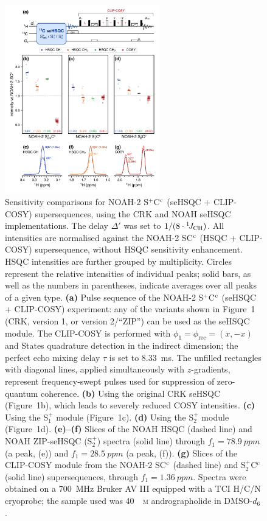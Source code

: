 \documentclass[final,twocolumn]{elsarticle}
\newcommand*{\noahCc}{C$\rm ^c$}
\newcommand*{\noahS}{S}
\newcommand*{\noahSp}{S$^+$}
\newcommand*{\noahSpa}{S$^+_1$}
\newcommand*{\noahSpb}{S$^+_2$}
\newcommand*{\onejch}{{}^{1}\!J_{\ce{CH}}}
\begin{document}
\begin{figure}[!ht]
    \centering
    \includegraphics[width=0.6\textwidth]{FIG2.png}
    \caption{
        Sensitivity comparisons for NOAH-2 \noahSp{}\noahCc{} (seHSQC + CLIP-COSY) supersequences, using the CRK and NOAH seHSQC implementations.
        The delay $\Delta'$ was set to $1/(8\cdot\onejch)$.
        All intensities are normalised against the NOAH-2 \noahS{}\noahCc{} (HSQC + CLIP-COSY) supersequence, without HSQC sensitivity enhancement.
        HSQC intensities are further grouped by multiplicity.
        Circles represent the relative intensities of individual peaks; solid bars, as well as the numbers in parentheses, indicate averages over all peaks of a given type.
        \textbf{(a)} Pulse sequence of the NOAH-2 \noahSp{}\noahCc{} (seHSQC + CLIP-COSY) experiment: any of the variants shown in Figure~1 (CRK, version 1, or version 2/``ZIP'') can be used as the seHSQC module.
        The CLIP-COSY\cite{Koos2016ACIE} is performed with $\phi_1 = \phi_{\text{rec}} = (x, -x)$ and States quadrature detection in the indirect dimension; the perfect echo mixing delay $\tau$ is set to \SI{8.33}{\ms}.
        The unfilled rectangles with diagonal lines, applied simultaneously with $z$-gradients, represent frequency-swept pulses used for suppression of zero-quantum coherence.\cite{Thrippleton2003ACIE}
        \textbf{(b)} Using the original CRK seHSQC (Figure~1b), which leads to severely reduced COSY intensities.
        \textbf{(c)} Using the \noahSpa{} module (Figure~1c).
        \textbf{(d)} Using the \noahSpb{} module (Figure~1d).
        \textbf{(e)--(f)} Slices of the NOAH HSQC (dashed line) and NOAH ZIP-seHSQC (\noahSpb{}) spectra (solid line) through $f_1 = \SI{78.9}{ppm}$ (a  peak, (e)) and $f_1 = \SI{28.5}{ppm}$ (a  peak, (f)).
        \textbf{(g)} Slices of the CLIP-COSY module from the NOAH-2 \noahS{}\noahCc{} (dashed line) and \noahSpb{}\noahCc{} (solid line) supersequences, through $f_1 = \SI{1.36}{ppm}$.
        Spectra were obtained on a \SI{700}{\MHz} Bruker AV III equipped with a TCI H/C/N cryoprobe; the sample used was \SI{40}{\milli\textsc{m}} andrographolide in DMSO-$d_6$.
    }
    \label{fig:sehsqc_comp}
\end{figure}
\end{document}
